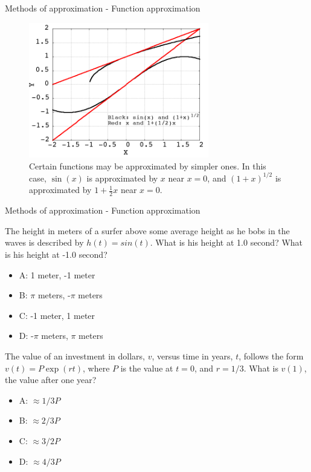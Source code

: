 \documentclass{beamer}
\begin{document}
\begin{frame}{Methods of approximation - Function approximation}
\begin{figure}
\centering
\includegraphics[width=0.7\textwidth]{figures/taylor_series.png}
\caption{\label{fig:approx} Certain functions may be approximated by simpler ones.  In this case, $\sin(x)$ is approximated by $x$ near $x=0$, and $(1+x)^{1/2}$ is approximated by $1+\frac{1}{2}x$ near $x=0$.}
\end{figure}
\end{frame}

\begin{frame}{Methods of approximation - Function approximation}
\small
\begin{minipage}[b]{0.45\linewidth}
The height in meters of a surfer above some average height as he bobs in the waves is described by $h(t) = sin(t)$.  What is his height at 1.0 second?  What is his height at -1.0 second?
\vspace{0.2cm}
\begin{itemize}
\item A: 1 meter, -1 meter
\item B: $\pi$ meters, -$\pi$ meters
\item C: -1 meter, 1 meter
\item D: -$\pi$ meters, $\pi$ meters
\end{itemize}
\end{minipage}
\hspace{0.5cm}
\begin{minipage}[b]{0.45\linewidth}
The value of an investment in dollars, $v$, versus time in years, $t$, follows the form $v(t) = P\exp(rt)$, where $P$ is the value at $t=0$, and $r=1/3$.  What is $v(1)$, the value after one year?
\vspace{0.6cm}
\begin{itemize}
\item A: $\approx 1/3 P$
\item B: $\approx 2/3 P$
\item C: $\approx 3/2 P$
\item D: $\approx 4/3 P$
\end{itemize}
\end{minipage}
\end{frame}
\end{document}
